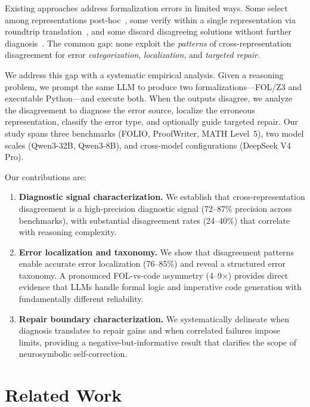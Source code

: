 \documentclass[11pt,a4paper]{article}
\begin{document}
Existing approaches address formalization errors in limited ways. Some select among representations post-hoc~\cite{hybridmind2025}, some verify within a single representation via roundtrip translation~\cite{vericot2025,verge2025}, and some discard disagreeing solutions without further diagnosis~\cite{liang2024cotpot,prove2024}. The common gap: none exploit the \emph{patterns} of cross-representation disagreement for error \emph{categorization}, \emph{localization}, and \emph{targeted repair}.

We address this gap with a systematic empirical analysis. Given a reasoning problem, we prompt the same LLM to produce two formalizations---FOL/Z3 and executable Python---and execute both. When the outputs disagree, we analyze the disagreement to diagnose the error source, localize the erroneous representation, classify the error type, and optionally guide targeted repair. Our study spans three benchmarks (FOLIO, ProofWriter, MATH Level~5), two model scales (Qwen3-32B, Qwen3-8B), and cross-model configurations (DeepSeek V4 Pro).

Our contributions are:
\begin{enumerate}
\item \textbf{Diagnostic signal characterization.} We establish that cross-representation disagreement is a high-precision diagnostic signal (72--87\% precision across benchmarks), with substantial disagreement rates (24--40\%) that correlate with reasoning complexity.

\item \textbf{Error localization and taxonomy.} We show that disagreement patterns enable accurate error localization (76--85\%) and reveal a structured error taxonomy. A pronounced FOL-vs-code asymmetry (4--9$\times$) provides direct evidence that LLMs handle formal logic and imperative code generation with fundamentally different reliability.

\item \textbf{Repair boundary characterization.} We systematically delineate when diagnosis translates to repair gains and when correlated failures impose limits, providing a negative-but-informative result that clarifies the scope of neurosymbolic self-correction.
\end{enumerate}

\section{Related Work}
\label{sec:related}
\end{document}
